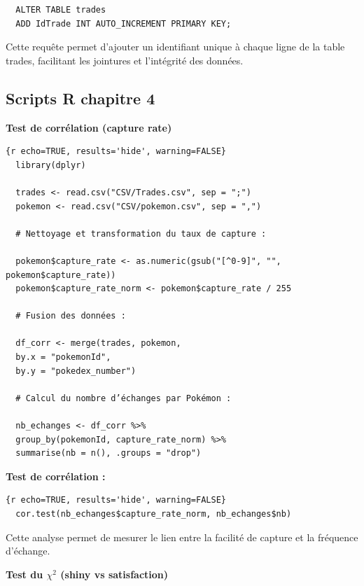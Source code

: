 \documentclass[mstat,12pt]{unswthesis}
\begin{document}
\begin{verbatim}
  ALTER TABLE trades
  ADD IdTrade INT AUTO_INCREMENT PRIMARY KEY;
\end{verbatim}

\smallskip

Cette requête permet d'ajouter un identifiant unique à chaque ligne de
la table trades, facilitant les jointures et l'intégrité des données.

\bigskip
\bigskip

\subsection{Scripts R chapitre 4}\label{scripts-r-chapitre-4}

\textbf{Test de corrélation (capture rate)}

\begin{verbatim}
{r echo=TRUE, results='hide', warning=FALSE}
  library(dplyr)
  
  trades <- read.csv("CSV/Trades.csv", sep = ";")
  pokemon <- read.csv("CSV/pokemon.csv", sep = ",")
  
  # Nettoyage et transformation du taux de capture :
  
  pokemon$capture_rate <- as.numeric(gsub("[^0-9]", "", pokemon$capture_rate))
  pokemon$capture_rate_norm <- pokemon$capture_rate / 255
  
  # Fusion des données :
  
  df_corr <- merge(trades, pokemon,
  by.x = "pokemonId",
  by.y = "pokedex_number")
  
  # Calcul du nombre d’échanges par Pokémon :
  
  nb_echanges <- df_corr %>%
  group_by(pokemonId, capture_rate_norm) %>%
  summarise(nb = n(), .groups = "drop")
\end{verbatim}

\bigskip
\bigskip

\textbf{Test de corrélation :}

\begin{verbatim}
{r echo=TRUE, results='hide', warning=FALSE}
  cor.test(nb_echanges$capture_rate_norm, nb_echanges$nb)
\end{verbatim}

\smallskip

Cette analyse permet de mesurer le lien entre la facilité de capture et
la fréquence d'échange.

\bigskip
\bigskip

\textbf{Test du \(\chi^2\) (shiny vs satisfaction)}
\end{document}
